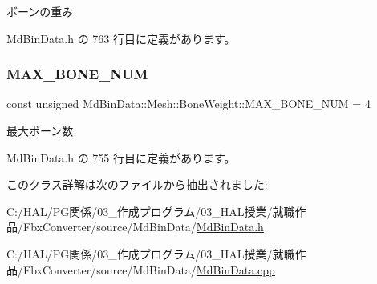 ボーンの重み 



 Md\+Bin\+Data.\+h の 763 行目に定義があります。

\mbox{\label{class_md_bin_data_1_1_mesh_1_1_bone_weight_a2c870f6c96315b6b9630cff3c24b79e7}} 
\subsubsection{\texorpdfstring{M\+A\+X\+\_\+\+B\+O\+N\+E\+\_\+\+N\+UM}{MAX\_BONE\_NUM}}
{\footnotesize\ttfamily const unsigned Md\+Bin\+Data\+::\+Mesh\+::\+Bone\+Weight\+::\+M\+A\+X\+\_\+\+B\+O\+N\+E\+\_\+\+N\+UM = 4\hspace{0.3cm}{\ttfamily [static]}}



最大ボーン数 



 Md\+Bin\+Data.\+h の 755 行目に定義があります。



このクラス詳解は次のファイルから抽出されました\+:\begin{DoxyCompactItemize}
\item 
C\+:/\+H\+A\+L/\+P\+G関係/03\+\_\+作成プログラム/03\+\_\+\+H\+A\+L授業/就職作品/\+Fbx\+Converter/source/\+Md\+Bin\+Data/\mbox{\hyperlink{_md_bin_data_8h}{Md\+Bin\+Data.\+h}}\item 
C\+:/\+H\+A\+L/\+P\+G関係/03\+\_\+作成プログラム/03\+\_\+\+H\+A\+L授業/就職作品/\+Fbx\+Converter/source/\+Md\+Bin\+Data/\mbox{\hyperlink{_md_bin_data_8cpp}{Md\+Bin\+Data.\+cpp}}\end{DoxyCompactItemize}
